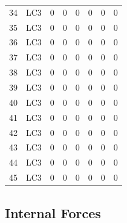 \documentclass{article}%
\begin{document}
\begin{longtable}{| c c | c c c c c c |}
34&LC3&0&0&0&0&0&0\\%
35&LC3&0&0&0&0&0&0\\%
36&LC3&0&0&0&0&0&0\\%
37&LC3&0&0&0&0&0&0\\%
38&LC3&0&0&0&0&0&0\\%
39&LC3&0&0&0&0&0&0\\%
40&LC3&0&0&0&0&0&0\\%
41&LC3&0&0&0&0&0&0\\%
42&LC3&0&0&0&0&0&0\\%
43&LC3&0&0&0&0&0&0\\%
44&LC3&0&0&0&0&0&0\\%
45&LC3&0&0&0&0&0&0\\%
\end{longtable}

%
\subsection{Internal Forces}%
\label{subsec:InternalForces}%
\end{document}
